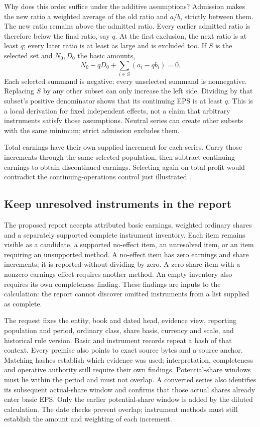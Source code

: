 Why does this order suffice under the additive assumptions? Admission makes
the new ratio a weighted average of the old ratio and $a/b$, strictly between
them. The new ratio remains above the admitted ratio. Every earlier admitted
ratio is therefore below the final ratio, say $q$. At the first exclusion,
the next ratio is at least $q$; every later ratio is at least as large and
is excluded too. If $S$ is the selected set and $N_0,D_0$ the basic amounts,
\[
 N_0-qD_0+\sum_{i\in S}(a_i-qb_i)=0.
\]
Each selected summand is negative; every unselected summand is nonnegative.
Replacing $S$ by any other subset can only increase the left side. Dividing
by that subset's positive denominator shows that its continuing EPS is at
least $q$. This is a local derivation for fixed independent effects, not a
claim that arbitrary instruments satisfy those assumptions. Neutral series
can create other subsets with the same minimum; strict admission excludes them.

Total earnings have their own supplied increment for each series. Carry
those increments through the same selected population, then subtract
continuing earnings to obtain discontinued earnings. Selecting again on
total profit would contradict the continuing-operations control just
illustrated \citep[IAS~33, paragraph A3]{eu20231803}.

\subsection{Keep unresolved instruments in the report}
\label{sec:ordered-eps-report}

The proposed  report accepts attributed basic earnings,
weighted ordinary shares and a separately supported complete instrument
inventory. Each item remains visible as a candidate, a supported no-effect
item, an unresolved item, or an item requiring an unsupported method.
A no-effect item has zero earnings and share increments; it is reported
without dividing by zero. A zero-share item with a nonzero earnings effect
requires another method. An empty inventory also requires its own completeness
finding. These findings are inputs to the calculation: the report cannot
discover omitted instruments from a list supplied as complete.

The request fixes the entity, book and dated head, evidence view, reporting
population and period, ordinary class, share basis, currency and scale, and
historical rule version. Basic and instrument records repeat a hash of that
context. Every premise also points to exact source bytes and a source anchor.
Matching hashes establish which evidence was used; interpretation, completeness
and operative authority still require their own findings. Potential-share
windows must lie within the period and must not overlap. A converted series
also identifies its subsequent actual-share window and confirms that those
actual shares already enter basic EPS. Only the earlier potential-share window
is added by the diluted calculation.
The date checks prevent overlap; instrument methods must still establish the
amount and weighting of each increment.

